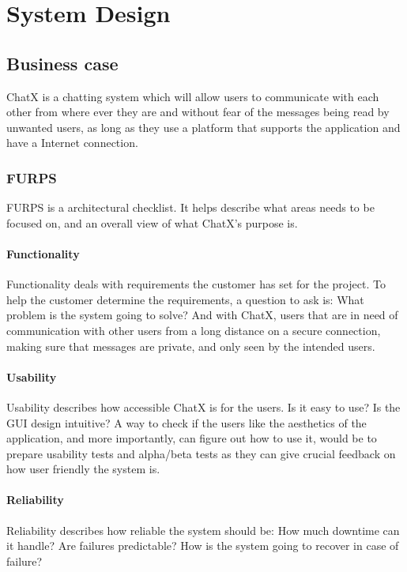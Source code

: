 \chapter{System Design}

\section{Business case}

ChatX is a chatting system which will allow users to communicate with each other from where ever they are and without fear of the messages being read by unwanted users, as long as they use a platform that supports the application and have a Internet connection.

\subsection{FURPS}
FURPS is a architectural checklist. It helps describe what areas needs to be focused on, and an overall view of what ChatX's purpose is.

\subsubsection{Functionality}
Functionality deals with requirements the customer has set for the project. To help the customer determine the requirements, a question to ask is: What problem is the system going to solve? And with ChatX, users that are in need of communication with other users from a long distance on a secure connection, making sure that messages are private, and only seen by the intended users.

\subsubsection{Usability}
Usability describes how accessible ChatX is for the users. Is it easy to use? Is the GUI design intuitive? A way to check if the users like the aesthetics of the application, and more importantly, can figure out how to use it, would be to prepare usability tests and alpha/beta tests as they can give crucial feedback on how user friendly the system is.

\subsubsection{Reliability} 
Reliability describes how reliable the system should be: How much downtime can it handle? Are failures predictable? How is the system going to recover in case of failure? 

